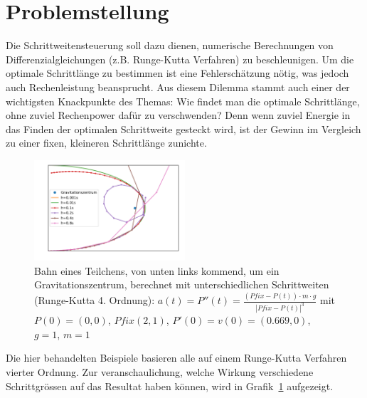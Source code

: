 %
%
%
\section{Problemstellung
\label{steps:section:problemstellung}}
Die Schrittweitensteuerung soll dazu dienen, numerische Berechnungen von Differenzialgleichungen (z.B. Runge-Kutta Verfahren) zu beschleunigen.
Um die optimale Schrittlänge zu bestimmen ist eine Fehlerschätzung nötig,
was jedoch auch Rechenleistung beansprucht.
Aus diesem Dilemma stammt auch einer der wichtigsten Knackpunkte des Themas:
Wie findet man die optimale Schrittlänge, ohne zuviel Rechenpower dafür zu verschwenden?
Denn wenn zuviel Energie in das Finden der optimalen Schrittweite gesteckt wird,
ist der Gewinn im Vergleich zu einer fixen, kleineren Schrittlänge zunichte.

\begin{figure}
\centering
\includegraphics[width=0.5\textwidth]{papers/steps/img/gravity_different_fixed_stepsize.pdf}
\caption{Bahn eines Teilchens, von unten links kommend,
um ein Gravitationszentrum, berechnet mit unterschiedlichen Schrittweiten (Runge-Kutta 4. Ordnung):
$a(t)=P''(t)=\frac{(Pfix-P(t))\cdot m\cdot g}{|Pfix-P(t)|^{3}}$
mit $P(0)=(0, 0)$, $Pfix(2, 1)$, $P'(0)=v(0)=(0.669, 0)$, $g=1$, $m=1$
\label{buch:steps:fixed_comparison}}
\end{figure}
Die hier behandelten Beispiele basieren alle auf einem Runge-Kutta Verfahren
vierter Ordnung. Zur veranschaulichung, welche Wirkung verschiedene Schrittgrössen
auf das Resultat haben können, wird in Grafik~\ref{buch:steps:fixed_comparison} aufgezeigt.





